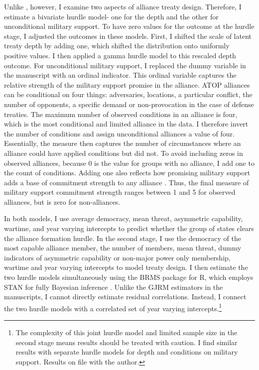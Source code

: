 \documentclass[12pt]{article}
\begin{document}
Unlike \citet{Chibaetal2015}, however, I examine two aspects of alliance treaty design. 
Therefore, I estimate a bivariate hurdle model- one for the depth and the other for unconditional military support. 
To have zero values for the outcome at the hurdle stage, I adjusted the outcomes in these models. 
First, I shifted the scale of latent treaty depth by adding one, which shifted the distribution onto uniformly positive values. 
I then applied a gamma hurdle model to this rescaled depth outcome.  
For unconditional military support, I replaced the dummy variable in the manuscript with an ordinal indicator.
This ordinal variable captures the relative strength of the military support promise in the alliance. 
ATOP alliances can be conditional on four things: adversaries, locations, a particular conflict, the number of opponents, a specific demand or non-provocation in the case of defense treaties. 
The maximum number of observed conditions in an alliance is four, which is the most conditional and limited alliance in the data. 
I therefore invert the number of conditions and assign unconditional alliances a value of four. 
Essentially, the measure then captures the number of circumstances where an alliance could have applied conditions but did not. 
To avoid including zeros in observed alliances, because 0 is the value for groups with no alliance, I add one to the count of conditions.
Adding one also reflects how promising military support adds a base of commitment strength to any alliance \citep{Morrow2000}. 
Thus, the final measure of military support commitment strength ranges between 1 and 5 for observed alliances, but is zero for non-alliances. 


In both models, I use average democracy, mean threat, asymmetric capability, wartime, and year varying intercepts to predict whether the group of states clears the alliance formation hurdle.
In the second stage, I use the democracy of the most capable alliance member, the number of members, mean threat, dummy indicators of asymmetric capability or non-major power only membership, wartime and year varying intercepts to model treaty design. 
I then estimate the two hurdle models simultaneously using the BRMS package for \textsf{R}, which employs STAN for fully Bayesian inference \citep{Buerkner2017}. 
Unlike the GJRM estimators in the manuscripts, I cannot directly estimate residual correlations.
Instead, I connect the two hurdle models with a correlated set of year varying intercepts.\footnote{The complexity of this joint hurdle model and limited sample size in the second stage means results should be treated with caution. I find similar results with separate hurdle models for depth and conditions on military support. Results on file with the author.} 
\end{document}
